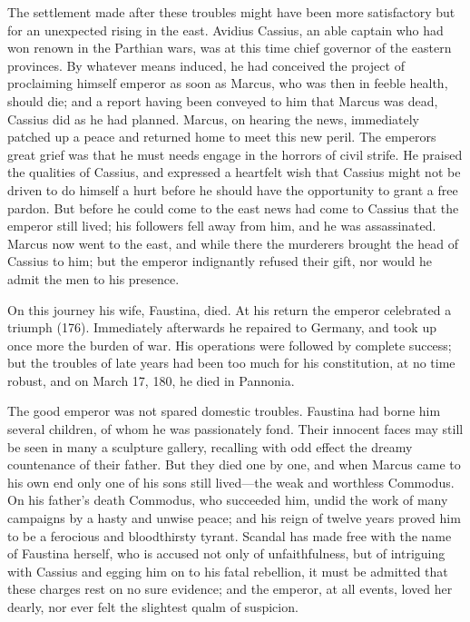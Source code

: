 The settlement made after these troubles might have been more satisfactory but
for an unexpected rising in the east. Avidius Cassius, an able captain who had
won renown in the Parthian wars, was at this time chief governor of the eastern
provinces. By whatever means induced, he had conceived the project of
proclaiming himself emperor as soon as Marcus, who was then in feeble health,
should die; and a report having been conveyed to him that Marcus was dead,
Cassius did as he had planned. Marcus, on hearing the news, immediately patched
up a peace and returned home to meet this new peril. The emperors great grief
was that he must needs engage in the horrors of civil strife. He praised the
qualities of Cassius, and expressed a heartfelt wish that Cassius might not be
driven to do himself a hurt before he should have the opportunity to grant a
free pardon. But before he could come to the east news had come to Cassius that
the emperor still lived; his followers fell away from him, and he was
assassinated. Marcus now went to the east, and while there the murderers
brought the head of Cassius to him; but the emperor indignantly refused their
gift, nor would he admit the men to his presence.

On this journey his wife, Faustina, died. At his return the emperor celebrated
a triumph (176). Immediately afterwards he repaired to Germany, and took up
once more the burden of war. His operations were followed by complete success;
but the troubles of late years had been too much for his constitution, at no
time robust, and on March 17, 180, he died in Pannonia.

The good emperor was not spared domestic troubles. Faustina had borne him
several children, of whom he was passionately fond. Their innocent faces may
still be seen in many a sculpture gallery, recalling with odd effect the dreamy
countenance of their father. But they died one by one, and when Marcus came to
his own end only one of his sons still lived—the weak and worthless
Commodus. On his father's death Commodus, who succeeded him, undid the work of
many campaigns by a hasty and unwise peace; and his reign of twelve years
proved him to be a ferocious and bloodthirsty tyrant. Scandal has made free
with the name of Faustina herself, who is accused not only of unfaithfulness,
but of intriguing with Cassius and egging him on to his fatal rebellion, it
must be admitted that these charges rest on no sure evidence; and the emperor,
at all events, loved her dearly, nor ever felt the slightest qualm of
suspicion.

